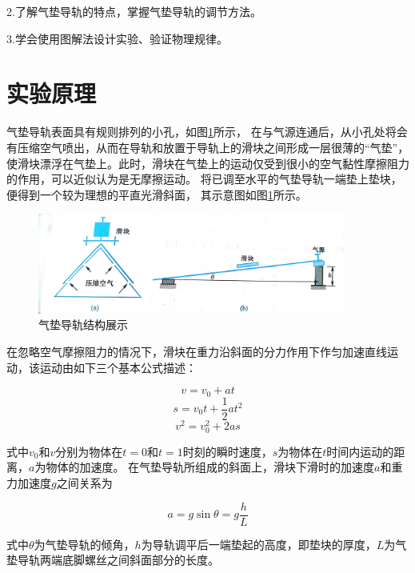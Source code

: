 \documentclass{ctexart}
\begin{document}
  2.\quad 了解气垫导轨的特点，掌握气垫导轨的调节方法。
  
  3.\quad 学会使用图解法设计实验、验证物理规律。

\section{实验原理}
气垫导轨表面具有规则排列的小孔，如图\ref{jiegou}所示，
在与气源连通后，从小孔处将会有压缩空气喷出，从而在导轨和放置于导轨上的滑块之间形成一层很薄的“气垫”，
使滑块漂浮在气垫上。此时，滑块在气垫上的运动仅受到很小的空气黏性摩擦阻力的作用，可以近似认为是无摩擦运动。
将已调至水平的气垫导轨一端垫上垫块，便得到一个较为理想的平直光滑斜面，
其示意图如图\ref{jiegou}所示。

\begin{figure}[H]
  \centering
  \includegraphics[height=0.2\textheight,width=0.9\textwidth]{jiegou.jpg}
  \caption{气垫导轨结构展示}\label{jiegou}
\end{figure}

在忽略空气摩擦阻力的情况下，滑块在重力沿斜面的分力作用下作匀加速直线运动，该运动由如下三个基本公式描述：

\begin{equation}
  v = v_{0} + at
\end{equation}
\begin{equation}
  s = v_{0}t + \frac{1}{2} at^{2}
\end{equation}
\begin{equation}\label{v2}
  v^{2} = v_{0}^{2} + 2as
\end{equation}

式中$v_{0}$和$v$分别为物体在$t=0$和$t=1$时刻的瞬时速度，$s$为物体在$t$时间内运动的距离，$a$为物体的加速度。
在气垫导轨所组成的斜面上，滑块下滑时的加速度$a$和重力加速度$g$之间关系为

\begin{equation}\label{jiasudu}
  a = g\sin\theta = g\frac{h}{L}
\end{equation}

式中$\theta$为气垫导轨的倾角，$h$为导轨调平后一端垫起的高度，即垫块的厚度，$L$为气
垫导轨两端底脚螺丝之间斜面部分的长度。
\end{document}
